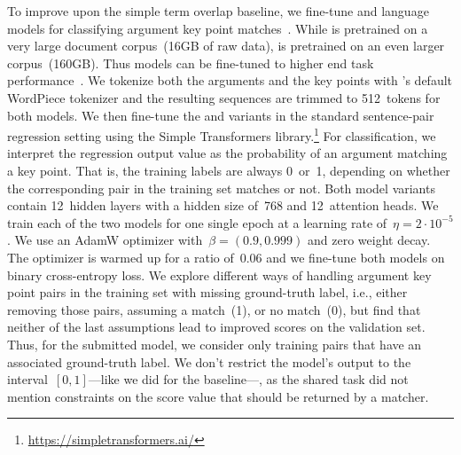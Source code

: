 To improve upon the simple term overlap baseline, we fine-tune \Bert and \Roberta language models for classifying argument key point matches~\cite{DevlinCLT2019,LiuOGDJCLLZS2019}.
While \Bert is pretrained on a very large document corpus~(16GB of raw data), \Roberta is pretrained on an even larger corpus~(160GB).
Thus \Roberta models can be fine-tuned to higher end task performance~\cite{LiuOGDJCLLZS2019}.
We tokenize both the arguments and the key points with \Bert's default WordPiece tokenizer and the resulting sequences are trimmed to 512~tokens for both models.
We then fine-tune the \BertBase and \RobertaBase variants in the standard sentence-pair regression setting using the Simple Transformers library.\footnote{\url{https://simpletransformers.ai/}}
For classification, we interpret the regression output value as the probability of an argument matching a key point.
That is, the training labels are always 0~or~1, depending on whether the corresponding pair in the training set matches or not.
Both model variants contain 12~hidden layers with a hidden size of~768 and 12~attention heads.
We train each of the two models for one single epoch at a learning rate of~\( \eta = 2 \cdot 10^{-5} \).
We use an AdamW optimizer with~\( \beta = (0.9, 0.999) \) and zero weight decay.
The optimizer is warmed up for a ratio of~0.06 and we fine-tune both models on binary cross-entropy loss.
We explore different ways of handling argument key point pairs in the training set with missing ground-truth label, i.e., either removing those pairs, assuming a match~(1), or no match~(0), but find that neither of the last assumptions lead to improved scores on the validation set.
Thus, for the submitted model, we consider only training pairs that have an associated ground-truth label.
We don't restrict the model's output to the interval~\([0,1]\)---like we did for the baseline---, as the shared task did not mention constraints on the score value that should be returned by a matcher.
